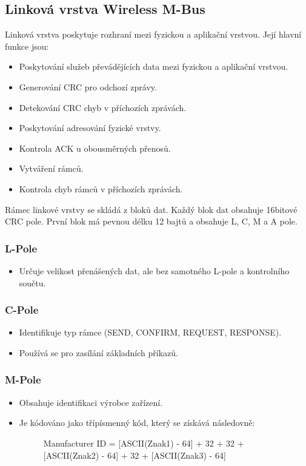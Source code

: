 \subsection{Linková vrstva Wireless M-Bus}

Linková vrstva poskytuje rozhraní mezi fyzickou a aplikační vrstvou. Její hlavní funkce jsou:
\begin{itemize}
	\item Poskytování služeb převádějících data mezi fyzickou a aplikační vrstvou.
	\item Generování CRC pro odchozí zprávy.
	\item Detekování CRC chyb v příchozích zprávách.
	\item Poskytování adresování fyzické vrstvy.
	\item Kontrola ACK u obousměrných přenosů.
	\item Vytváření rámců.
	\item Kontrola chyb rámců v příchozích zprávách.
\end{itemize}

Rámec linkové vrstvy se skládá z bloků dat. Každý blok dat obsahuje 16bitové CRC pole.  První blok má pevnou délku 12 bajtů a obsahuje L, C, M a A pole.

\subsubsection{L-Pole}
\begin{itemize}
	\item Určuje velikost přenášených dat, ale bez samotného L-pole a kontrolního součtu.	
\end{itemize}

\subsubsection{C-Pole}
\begin{itemize}
	\item Identifikuje typ rámce (SEND, CONFIRM, REQUEST, RESPONSE).
	\item Používá se pro zasílání základních příkazů.
\end{itemize}

\subsubsection{M-Pole}
\begin{itemize}
	\item Obsahuje identifikaci výrobce zařízení.
	\item Je kódováno jako třípísmenný kód, který se získává následovně:
			\begin{figure}[!ht]
				\begin{centerverbatim}
				Manufacturer ID = [ASCII(Znak1) - 64] + 32 + 32
												+ [ASCII(Znak2) - 64] + 32
												+ [ASCII(Znak3) - 64]
				\end{centerverbatim}
			\end{figure}
\end{itemize}
\vspace{-30pt}

